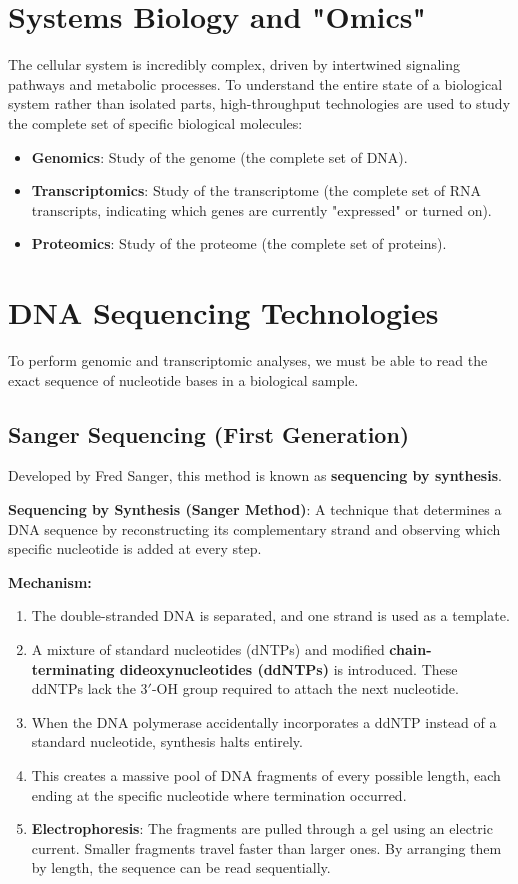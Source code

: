 \documentclass[11pt,a4paper]{article}
\newenvironment{important}{
    \vspace{1em}
    \begin{tcolorbox}[colback=blue!5!white, colframe=blue!75!black, boxrule=1pt, arc=4pt, left=10pt, right=10pt, top=10pt, bottom=10pt]
}{
    \end{tcolorbox}
    \vspace{1em}
}
\begin{document}
\section{Systems Biology and "Omics"}
The cellular system is incredibly complex, driven by intertwined signaling pathways and metabolic processes. To understand the entire state of a biological system rather than isolated parts, high-throughput technologies are used to study the complete set of specific biological molecules:
\begin{itemize}
    \item \textbf{Genomics}: Study of the genome (the complete set of DNA).
    \item \textbf{Transcriptomics}: Study of the transcriptome (the complete set of RNA transcripts, indicating which genes are currently "expressed" or turned on).
    \item \textbf{Proteomics}: Study of the proteome (the complete set of proteins).
\end{itemize}

\section{DNA Sequencing Technologies}
To perform genomic and transcriptomic analyses, we must be able to read the exact sequence of nucleotide bases in a biological sample.

\subsection{Sanger Sequencing (First Generation)}
Developed by Fred Sanger, this method is known as \textbf{sequencing by synthesis}.

\begin{important}
    \textbf{Sequencing by Synthesis (Sanger Method)}: A technique that determines a DNA sequence by reconstructing its complementary strand and observing which specific nucleotide is added at every step.
\end{important}

\textbf{Mechanism:}
\begin{enumerate}
    \item The double-stranded DNA is separated, and one strand is used as a template.
    \item A mixture of standard nucleotides (dNTPs) and modified \textbf{chain-terminating dideoxynucleotides (ddNTPs)} is introduced. These ddNTPs lack the \(3'\)-OH group required to attach the next nucleotide.
    \item When the DNA polymerase accidentally incorporates a ddNTP instead of a standard nucleotide, synthesis halts entirely.
    \item This creates a massive pool of DNA fragments of every possible length, each ending at the specific nucleotide where termination occurred.
    \item \textbf{Electrophoresis}: The fragments are pulled through a gel using an electric current. Smaller fragments travel faster than larger ones. By arranging them by length, the sequence can be read sequentially.
\end{enumerate}
\end{document}
